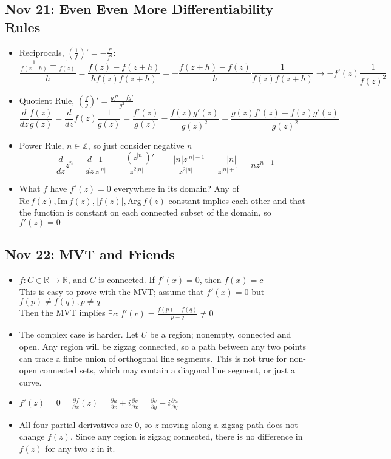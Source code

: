 \documentclass[10pt, oneside]{article}
\let\del\partial
\newcommand{\R}{\mathbb{R}}
\newcommand{\Z}{\mathbb{Z}}
\renewcommand{\Re}{\text{Re} \,}
\renewcommand{\Im}{\text{Im} \,}
\newcommand{\Arg}{\text{Arg} \,}
\begin{document}
\subsection{Nov 21: Even Even More Differentiability Rules}
\begin{itemize}
    \item Reciprocals, $(\frac{1}{f})' = -\frac{f'}{f^2}$:
        \[\frac{\frac{1}{f(z+h)} - \frac{1}{f(z)}}{h} = \frac{f(z) - f(z+h)}{hf(z)f(z+h)} = -\frac{f(z+h) - f(z)}{h} \frac{1}{f(z)f(z+h)} \rightarrow -f'(z) \frac{1}{f(z)^2}\]
    \item Quotient Rule, $(\frac{f}{g})' = \frac{gf' - fg'}{g^2}$
        \[\frac{d}{dz} \frac{f(z)}{g(z)} = \frac{d}{dz} f(z) \frac{1}{g(z)} = \frac{f'(z)}{g(z)}- \frac{f(z)g'(z)}{g(z)^2} = \frac{g(z)f'(z) - f(z)g'(z)}{g(z)^2}\]
    \item Power Rule, $n \in \Z$, so just consider negative $n$
        \[\frac{d}{dz} z^n = \frac{d}{dz} \frac{1}{z^{|n|}} = \frac{-(z^{|n|})'}{z^{2|n|}} = \frac{-|n| z^{|n| - 1}}{z^{2|n|}} = \frac{-|n|}{z^{|n| + 1}} = nz^{n-1}\]
    \item What $f$ have $f'(z) = 0$ everywhere in its domain? Any of $\Re f(z), \Im f(z), |f(z)|, \Arg f(z)$ constant implies each other and that the function is constant on each connected subset of the domain, so $f'(z) = 0$
\end{itemize}

\subsection{Nov 22: MVT and Friends}
\begin{itemize}
    \item $f : C \in \R \rightarrow \R$, and $C$ is connected. If $f'(x) = 0$,  then $f(x) = c$\\
        This is easy to prove with the MVT; assume that $f'(x) = 0$ but $f(p) \neq f(q), p \neq q$\\
        Then the MVT implies $\exists c : f'(c) = \frac{f(p) - f(q)}{p-q} \neq 0$
    \item The complex case is harder. Let $U$ be a region; nonempty, connected and open. Any region will be zigzag connected, so a path between any two points can trace a finite union of orthogonal line segments. This is not true for non-open connected sets, which may contain a diagonal line segment, or just a curve.
    \item $f'(z) = 0 = \frac{\del f}{\del x} (z) = \frac{\del u}{\del x} + i\frac{\del v}{\del x} = \frac{\del v}{\del y} - i\frac{\del u}{\del y}$
    \item All four partial derivatives are $0$, so $z$ moving along a zigzag path does not change $f(z)$. Since any region is zigzag connected, there is no difference in $f(z)$ for any two $z$ in it.
\end{itemize}
\end{document}
